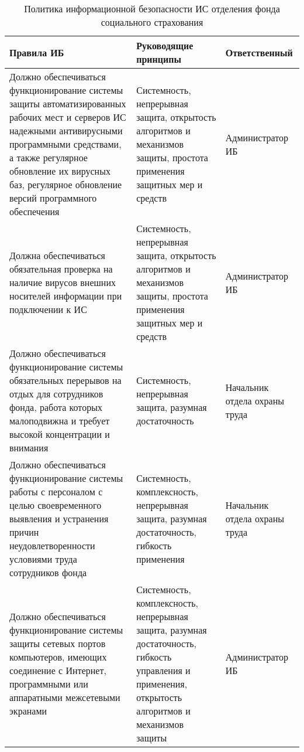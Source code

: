 \begin{table}[H]
  \caption{Политика информационной безопасности ИС отделения фонда
    социального страхования}
  \label{tab:politica_ib}
  \small
  \begin{tabular}{|p{6cm}|p{4cm}|p{4cm}|}
    \hline
    Правила ИБ & Руководящие принципы & Ответственный\\\hline
    Должно обеспечиваться функционирование системы защиты
    автоматизированных рабочих мест и серверов ИС надежными
    антивирусными программными средствами, а также регулярное
    обновление их вирусных баз, регулярное обновление версий
    программного обеспечения &
    Системность,  непрерывная защита, открытость алгоритмов и
    механизмов защиты, простота применения защитных мер и средств &
    Администратор ИБ \\\hline
    Должна обеспечиваться обязательная проверка на наличие вирусов
    внешних носителей информации при подключении к ИС &
    Системность,  непрерывная защита, открытость алгоритмов и
    механизмов защиты, простота применения защитных мер и средств &
    Администратор ИБ \\\hline
    Должно обеспечиваться функционирование системы обязательных
    перерывов на отдых для сотрудников фонда, работа которых
    малоподвижна и требует высокой концентрации и внимания &
    Системность, непрерывная защита, разумная достаточность &
    Начальник отдела охраны труда \\\hline
    Должно обеспечиваться функционирование системы работы с персоналом
    с целью своевременного выявления и устранения причин
    неудовлетворенности условиями труда сотрудников фонда &
    Системность, комплексность, непрерывная защита, разумная
    достаточность, гибкость применения &
    Начальник отдела охраны труда \\\hline
    Должно обеспечиваться функционирование системы защиты сетевых
    портов компьютеров, имеющих соединение с Интернет,
    программными или аппаратными межсетевыми экранами &
    Системность, комплексность,  непрерывная защита, разумная
    достаточность, гибкость управления и применения,  открытость
    алгоритмов и механизмов защиты &
    Администратор ИБ \\\hline
  \end{tabular}
  \label{tab:politica_ib}
\end{table}
\normalsize  
\cleardoublepage

